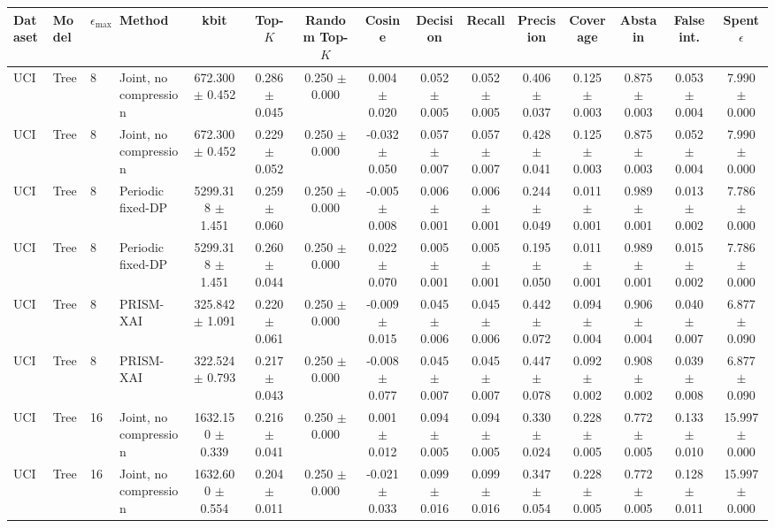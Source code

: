 \begin{tabular}{llllccccccccccc}
\toprule
Dataset & Model & $\epsilon_{\max}$ & Method & kbit & Top-$K$ & Random Top-$K$ & Cosine & Decision & Recall & Precision & Coverage & Abstain & False int. & Spent $\epsilon$ \\
\midrule
UCI & Tree & 8 & Joint, no compression & 672.300 $\pm$ 0.452 & 0.286 $\pm$ 0.045 & 0.250 $\pm$ 0.000 & 0.004 $\pm$ 0.020 & 0.052 $\pm$ 0.005 & 0.052 $\pm$ 0.005 & 0.406 $\pm$ 0.037 & 0.125 $\pm$ 0.003 & 0.875 $\pm$ 0.003 & 0.053 $\pm$ 0.004 & 7.990 $\pm$ 0.000 \\
UCI & Tree & 8 & Joint, no compression & 672.300 $\pm$ 0.452 & 0.229 $\pm$ 0.052 & 0.250 $\pm$ 0.000 & -0.032 $\pm$ 0.050 & 0.057 $\pm$ 0.007 & 0.057 $\pm$ 0.007 & 0.428 $\pm$ 0.041 & 0.125 $\pm$ 0.003 & 0.875 $\pm$ 0.003 & 0.052 $\pm$ 0.004 & 7.990 $\pm$ 0.000 \\
UCI & Tree & 8 & Periodic fixed-DP & 5299.318 $\pm$ 1.451 & 0.259 $\pm$ 0.060 & 0.250 $\pm$ 0.000 & -0.005 $\pm$ 0.008 & 0.006 $\pm$ 0.001 & 0.006 $\pm$ 0.001 & 0.244 $\pm$ 0.049 & 0.011 $\pm$ 0.001 & 0.989 $\pm$ 0.001 & 0.013 $\pm$ 0.002 & 7.786 $\pm$ 0.000 \\
UCI & Tree & 8 & Periodic fixed-DP & 5299.318 $\pm$ 1.451 & 0.260 $\pm$ 0.044 & 0.250 $\pm$ 0.000 & 0.022 $\pm$ 0.070 & 0.005 $\pm$ 0.001 & 0.005 $\pm$ 0.001 & 0.195 $\pm$ 0.050 & 0.011 $\pm$ 0.001 & 0.989 $\pm$ 0.001 & 0.015 $\pm$ 0.002 & 7.786 $\pm$ 0.000 \\
UCI & Tree & 8 & PRISM-XAI & 325.842 $\pm$ 1.091 & 0.220 $\pm$ 0.061 & 0.250 $\pm$ 0.000 & -0.009 $\pm$ 0.015 & 0.045 $\pm$ 0.006 & 0.045 $\pm$ 0.006 & 0.442 $\pm$ 0.072 & 0.094 $\pm$ 0.004 & 0.906 $\pm$ 0.004 & 0.040 $\pm$ 0.007 & 6.877 $\pm$ 0.090 \\
UCI & Tree & 8 & PRISM-XAI & 322.524 $\pm$ 0.793 & 0.217 $\pm$ 0.043 & 0.250 $\pm$ 0.000 & -0.008 $\pm$ 0.077 & 0.045 $\pm$ 0.007 & 0.045 $\pm$ 0.007 & 0.447 $\pm$ 0.078 & 0.092 $\pm$ 0.002 & 0.908 $\pm$ 0.002 & 0.039 $\pm$ 0.008 & 6.877 $\pm$ 0.090 \\
UCI & Tree & 16 & Joint, no compression & 1632.150 $\pm$ 0.339 & 0.216 $\pm$ 0.041 & 0.250 $\pm$ 0.000 & 0.001 $\pm$ 0.012 & 0.094 $\pm$ 0.005 & 0.094 $\pm$ 0.005 & 0.330 $\pm$ 0.024 & 0.228 $\pm$ 0.005 & 0.772 $\pm$ 0.005 & 0.133 $\pm$ 0.010 & 15.997 $\pm$ 0.000 \\
UCI & Tree & 16 & Joint, no compression & 1632.600 $\pm$ 0.554 & 0.204 $\pm$ 0.011 & 0.250 $\pm$ 0.000 & -0.021 $\pm$ 0.033 & 0.099 $\pm$ 0.016 & 0.099 $\pm$ 0.016 & 0.347 $\pm$ 0.054 & 0.228 $\pm$ 0.005 & 0.772 $\pm$ 0.005 & 0.128 $\pm$ 0.011 & 15.997 $\pm$ 0.000 \\

\end{tabular}
